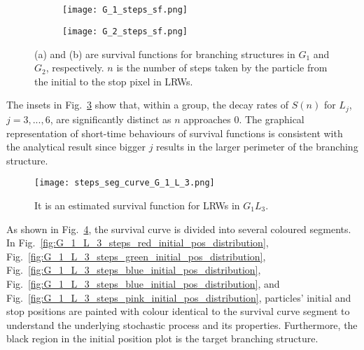 


\subsection{}

    
       \begin{figure}
        \centering 
        \begin{subfigure}[b]{0.45\textwidth}
          \texttt{[image: G\_1\_steps\_sf.png]}
          \caption{}
          \label{fig:sf_g1_branch_steps}
        \end{subfigure}
        \hfill
        \begin{subfigure}[b]{0.45\textwidth}
          \texttt{[image: G\_2\_steps\_sf.png]}
          \caption{}
          \label{fig:sf_g2_branch_steps}
        \end{subfigure}
        \caption{(a) and (b) are survival functions for branching
          structures in $G_1$ and $G_2$, respectively. $n$ is the
          number of steps taken by the particle from the initial to
          the stop pixel in LRWs.}
        \label{fig:sf_branch_steps}
      \end{figure}

       
       The insets in Fig.~\ref{fig:sf_branch_steps} show that, within
       a group, the decay rates of $S(n)$ for $L_j$, $j=3, ..., 6$,
       are significantly distinct as $n$ approaches $0$. The graphical
       representation of short-time behaviours of survival functions
       is consistent with the analytical result since bigger $j$
       results in the larger perimeter of the branching structure.
       

       \begin{figure}
         \centering
         \texttt{[image: steps\_seg\_curve\_G\_1\_L\_3.png]}
         \caption{It is an estimated survival function for LRWs in $G_1L_3$.}
         \label{fig:steps_seg_curve_G_1_L_3}
       \end{figure}

       
       As shown in Fig.~\ref{fig:steps_seg_curve_G_1_L_3}, the
       survival curve is divided into several coloured segments. In
       Fig.~\ref{fig:G_1_L_3_steps_red_initial_pos_distribution},
       Fig.~\ref{fig:G_1_L_3_steps_green_initial_pos_distribution},
       Fig.~\ref{fig:G_1_L_3_steps_blue_initial_pos_distribution},
       Fig.~\ref{fig:G_1_L_3_steps_blue_initial_pos_distribution}, and
       Fig.~\ref{fig:G_1_L_3_steps_pink_initial_pos_distribution},
       particles' initial and stop positions are painted with colour
       identical to the survival curve segment to understand the
       underlying stochastic process and its properties. Furthermore,
       the black region in the initial position plot is the target
       branching structure.

